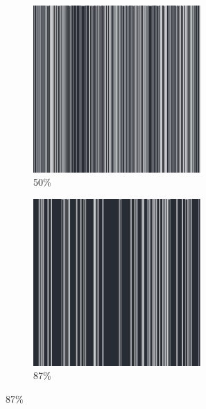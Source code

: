 \documentclass[12pt, fleqn]{report}                             %
\theoremstyle{break}                                            %
\begin{document}
\begin{figure}[h!]
\begin{subfigure}[b]{0.4\linewidth}
            \includegraphics[width=0.7\textwidth]{Images/108/c.png}
            \caption{50\%}
          \end{subfigure}
          \begin{subfigure}[b]{0.4\linewidth}
            \includegraphics[width=0.7\textwidth]{Images/108/d.png}
            \caption{87\%}
          \end{subfigure}
        \end{figure}
\end{document}
